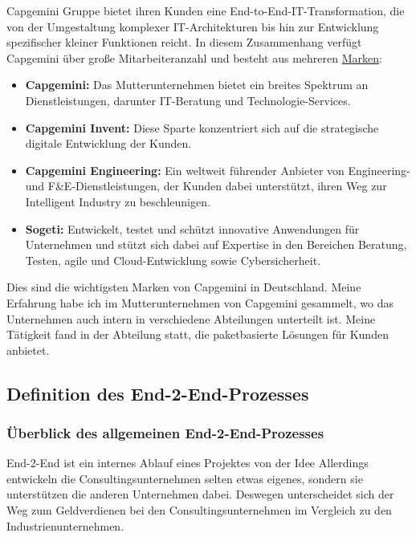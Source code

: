 \documentclass[a4paper, 12pt]{scrartcl}
\begin{document}
Capgemini Gruppe bietet ihren Kunden eine End-to-End-IT-Transformation, die von der Umgestaltung komplexer IT-Architekturen bis hin zur Entwicklung spezifischer kleiner Funktionen reicht. In diesem Zusammenhang verfügt Capgemini über große Mitarbeiteranzahl und besteht aus mehreren \href{https://www.capgemini.com/de-de/unternehmen/wer-wir-sind/unsere-marken/}{ Marken}:
	\begin{itemize}
		\item \textbf{Capgemini:} Das Mutterunternehmen bietet ein breites Spektrum an Dienstleistungen, darunter IT-Beratung und Technologie-Services.
		
		\item \textbf{Capgemini Invent:} Diese Sparte konzentriert sich auf die strategische digitale Entwicklung der Kunden.
		\item \textbf{Capgemini Engineering:} Ein weltweit führender Anbieter von Engineering- und F\&E-Dienstleistungen, der Kunden dabei unterstützt, ihren Weg zur Intelligent Industry zu beschleunigen.
		\item \textbf{Sogeti:} Entwickelt, testet und schützt innovative Anwendungen für Unternehmen und stützt sich dabei auf Expertise in den Bereichen Beratung, Testen, agile und Cloud-Entwicklung sowie Cybersicherheit.
	\end{itemize}
Dies sind die wichtigsten Marken von Capgemini in Deutschland. Meine Erfahrung habe ich im Mutterunternehmen von Capgemini gesammelt, wo das Unternehmen auch intern in verschiedene Abteilungen unterteilt ist. Meine Tätigkeit fand in der Abteilung statt, die paketbasierte Lösungen %
  für Kunden anbietet.


	\newpage
	\subsection{Definition des End-2-End-Prozesses}
	\subsubsection{Überblick des allgemeinen End-2-End-Prozesses} %
End-2-End ist ein internes Ablauf eines Projektes von der Idee  Allerdings entwickeln die Consultingsunternehmen selten etwas eigenes, sondern sie unterstützen die anderen Unternehmen dabei. Deswegen unterscheidet sich der Weg zum Geldverdienen bei den Consultingsunternehmen im Vergleich zu den Industrienunternehmen.
\end{document}
